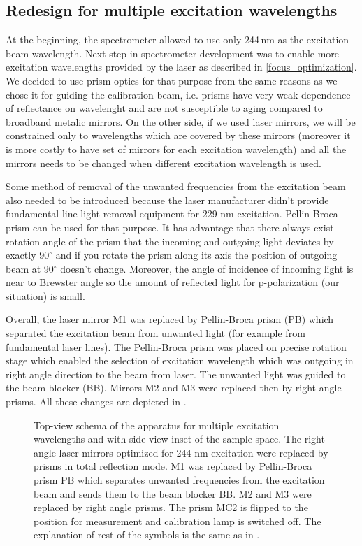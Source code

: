\subsection{Redesign for multiple excitation wavelengths}

At the beginning, the spectrometer allowed to use only 244\,nm as the
excitation beam wavelength. Next step in spectrometer development was to
enable more excitation wavelengths provided by the laser as described in
\cref{focus_optimization}.
We decided to use prism optics for that purpose from the same reasons as we
chose it for guiding the calibration beam, i.e. prisms have very weak
dependence of reflectance on wavelenght and are not susceptible to aging
compared to broadband metalic mirrors. On the other side, if we used laser
mirrors, we will be constrained only to wavelengths which are covered by
these mirrors (moreover it is more costly to have set of mirrors for each
excitation wavelength) and all the mirrors needs to be changed when different
excitation wavelength is used.

Some method of removal of the unwanted frequencies from the excitation beam
also needed to be introduced because the laser manufacturer didn't provide
fundamental line light removal equipment for 229-nm excitation. Pellin-Broca
prism can be used for that purpose. It has advantage that there always exist
rotation angle of the prism that the incoming and outgoing light deviates by
exactly 90$^\circ$ and if you rotate the prism along its axis the position of
outgoing beam at 90$^\circ$ doesn't change. Moreover, the angle of incidence of
incoming light is near to Brewster angle so the amount of reflected light for
p-polarization (our situation) is small.

Overall, the laser mirror M1 was replaced by Pellin-Broca prism (PB) which
separated the excitation beam from unwanted light (for example from fundamental
laser lines). The Pellin-Broca prism was placed on precise rotation stage
which enabled the selection of excitation wavelength which was outgoing in
right angle direction to the beam from laser. The unwanted light was guided to
the beam blocker (BB). Mirrors M2 and M3 were replaced then by right angle
prisms. All these changes are depicted in
.

\begin{figure}
	\centering
	
	\caption{Top-view schema of the apparatus for multiple excitation wavelengths
		and with side-view inset of the sample space. The right-angle laser
		mirrors optimized for 244-nm excitation were replaced by prisms in total
		reflection mode. M1 was replaced by Pellin-Broca prism PB which separates
		unwanted frequencies from the excitation beam and sends them to the beam
		blocker BB. M2 and M3 were replaced by right angle prisms. The prism MC2 is
		flipped to the position for measurement and calibration lamp is switched
		off. The explanation of rest of the symbols is the same as in
		.}
	\label{\figlabel{multiple_excitations:apparatus_schema}}
\end{figure}
